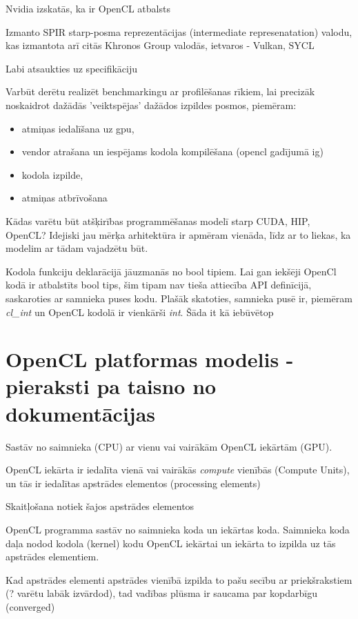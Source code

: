 \documentclass[12pt]{report}%
\theoremstyle{definition}
\begin{document}
Nvidia izskatās, ka ir OpenCL atbalsts

Izmanto SPIR starp-posma reprezentācijas (intermediate represenatation) valodu,
kas izmantota arī citās Khronos Group valodās, ietvaros - Vulkan, SYCL

Labi atsaukties uz specifikāciju \cite{opencl-spec}

Varbūt derētu realizēt benchmarkingu ar profilēšanas rīkiem, lai precizāk noskaidrot dažādās 'veiktspējas'
dažādos izpildes posmos, piemēram:
\begin{itemize}
    \item atmiņas iedalīšana uz gpu,
    \item vendor atrašana un iespējams kodola kompilēšana (opencl gadījumā ig)
    \item kodola izpilde,
    \item atmiņas atbrīvošana
\end{itemize}


Kādas varētu būt atšķirības programmēšanas modelī starp CUDA, HIP, OpenCL?
Idejiski jau mērķa arhitektūra ir apmēram vienāda, līdz ar to liekas, ka
modelim ar tādam vajadzētu būt.

Kodola funkciju deklarācijā jāuzmanās no bool tipiem. Lai gan iekšēji OpenCl
kodā ir atbalstīts bool tips, šim tipam nav tieša attiecība API definīcijā,
saskaroties ar samnieka puses kodu. Plašāk skatoties, samnieka pusē ir,
piemēram \textit{cl\_int} un OpenCL kodolā ir vienkārši \textit{int}. Šāda it
kā iebūvētop

\section{OpenCL platformas modelis - pieraksti pa taisno no dokumentācijas}
Sastāv no saimnieka (CPU) ar vienu vai vairākām OpenCL iekārtām (GPU).

OpenCL iekārta ir iedalīta vienā vai vairākās \textit{compute} vienībās (Compute Units), un tās ir iedalītas apstrādes elementos (processing elements)

Skaitļošana notiek šajos apstrādes elementos

OpenCL programma sastāv no saimnieka koda un iekārtas koda. 
Saimnieka koda daļa nodod kodola (kernel) kodu OpenCL iekārtai un iekārta to izpilda uz tās apstrādes elementiem.


Kad apstrādes elementi apstrādes vienībā izpilda to pašu secību ar priekšrakstiem (? varētu labāk izvārdod), tad vadības plūsma ir saucama par kopdarbīgu (converged)
\end{document}
